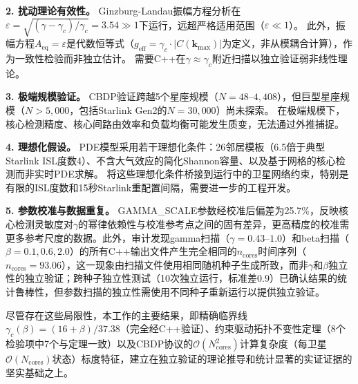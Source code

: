 \documentclass[sn-nature,pdflatex]{sn-jnl}
\begin{document}
\textbf{2. 扰动理论有效性。}
Ginzburg-Landau振幅方程分析在$\varepsilon = \sqrt{(\gamma-\gamma_c)/\gamma_c} = 3.54 \gg 1$下运行，远超严格适用范围（$\varepsilon \ll 1$）。
此外，振幅方程$A_{\text{eq}} = \varepsilon$是代数恒等式（$g_{\text{eff}} = \gamma_c \cdot |C(\mathbf{k}_{\max})|$为定义，非从模耦合计算），作为一致性检验而非独立估计。
需要C++在$\gamma \approx \gamma_c$附近扫描以独立验证弱非线性理论。

\textbf{3. 极端规模验证。}
CBDP验证跨越5个星座规模（$N=48$--$4,408$），但巨型星座规模（$N>5,000$，包括Starlink Gen2的$N=30,000$）尚未探索。
在极端规模下，核心检测精度、核心间路由效率和负载均衡可能发生质变，无法通过外推捕捉。

\textbf{4. 理想化假设。}
PDE模型采用若干理想化条件：26邻居模板（6.5倍于典型Starlink ISL度数4）、不含大气效应的简化Shannon容量、以及基于网格的核心检测而非实时PDE求解。
将这些理想化条件桥接到运行中的卫星网络约束，特别是有限的ISL度数和15秒Starlink重配置间隔，需要进一步的工程开发。

\textbf{5. 参数校准与数据重复。}
GAMMA\_SCALE参数经校准后偏差为25.7\%，反映核心检测灵敏度对$\gamma$的幂律依赖性与校准参考点之间的固有差异，更高精度的校准需更多参考尺度的数据。此外，审计发现gamma扫描（$\gamma=0.43$--$1.0$）和beta扫描（$\beta=0.1, 0.6, 2.0$）的所有C++输出文件产生完全相同的$n_{\text{cores}}$时间序列（$n_{\text{cores}}=93.06$），这一现象由扫描文件使用相同随机种子生成所致，而非$\gamma$和$\beta$独立性的独立验证；跨种子独立性测试（10次独立运行，标准差$0.9$）已确认结果的统计鲁棒性，但参数扫描的独立性需使用不同种子重新运行以提供独立验证。

尽管存在这些局限性，本工作的主要结果，即精确临界线$\gamma_c(\beta) = (16+\beta)/37.38$（完全经C++验证）、约束驱动拓扑不变性定理（8个检验项中7个与定理一致）以及CBDP协议的$\mathcal{O}(N_{\text{cores}}^2)$计算复杂度（每卫星$\mathcal{O}(N_{\text{cores}})$状态）标度特征，建立在独立验证的理论推导和统计显著的实证证据的坚实基础之上。
\end{document}
